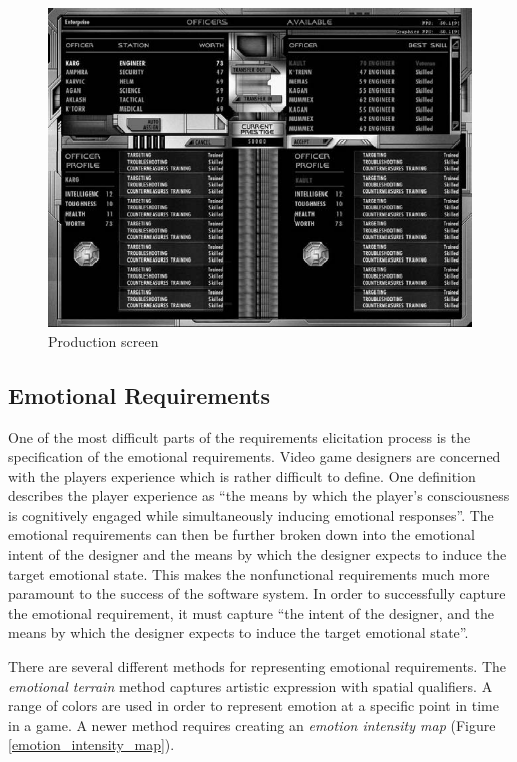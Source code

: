 \begin{figure}[htb]
	\includegraphics[scale=0.5]{Images/final}
	\caption{Production screen \cite{bethke2003game}}
	\label{final}
\end{figure}

\subsection{Emotional Requirements}

One of the most difficult parts of the requirements elicitation process is the specification of the emotional requirements. Video game designers are concerned with the players experience which is rather difficult to define. One definition describes the player experience as ``the means by which the player's consciousness is cognitively engaged while simultaneously inducing emotional responses''\cite{callele2006emotional}. The emotional requirements can then be further broken down into the emotional intent of the designer and the means by which the designer expects to induce the target emotional state\cite{callele2006emotional}. This makes the nonfunctional requirements much more paramount to the success of the software system. In order to successfully capture the emotional requirement, it must capture ``the intent of the designer, and the means by which the designer expects to induce the target emotional state''\cite{callele2006emotional}.

There are several different methods for representing emotional requirements. The \emph{emotional terrain} method captures artistic expression with spatial qualifiers. A range of colors are used in order to represent emotion at a specific point in time in a game. A newer method requires creating an \emph{emotion intensity map} (Figure \ref{emotion_intensity_map}).

